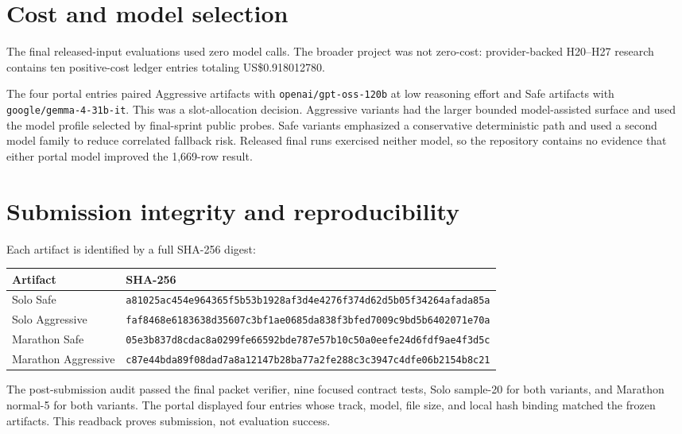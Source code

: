 \documentclass[10pt]{article}
\newcommand{\code}[1]{\texttt{#1}}
\begin{document}
\section{Cost and model selection}

The final released-input evaluations used zero model calls. The broader project was not zero-cost: provider-backed H20--H27 research contains ten positive-cost ledger entries totaling US\$0.918012780.

The four portal entries paired Aggressive artifacts with \code{openai/gpt-oss-120b} at low reasoning effort and Safe artifacts with \code{google/gemma-4-31b-it}. This was a slot-allocation decision. Aggressive variants had the larger bounded model-assisted surface and used the model profile selected by final-sprint public probes. Safe variants emphasized a conservative deterministic path and used a second model family to reduce correlated fallback risk. Released final runs exercised neither model, so the repository contains no evidence that either portal model improved the 1,669-row result.

\section{Submission integrity and reproducibility}

Each artifact is identified by a full SHA-256 digest:

\begin{longtable}{p{}p{}}
\toprule
Artifact & SHA-256 \\
\midrule
Solo Safe & \code{a81025ac454e964365f5b53b1928af3d4e4276f374d62d5b05f34264afada85a} \\
Solo Aggressive & \code{faf8468e6183638d35607c3bf1ae0685da838f3bfed7009c9bd5b6402071e70a} \\
Marathon Safe & \code{05e3b837d8cdac8a0299fe66592bde787e57b10c50a0eefe24d6fdf9ae4f3d5c} \\
Marathon Aggressive & \code{c87e44bda89f08dad7a8a12147b28ba77a2fe288c3c3947c4dfe06b2154b8c21} \\
\bottomrule
\end{longtable}

The post-submission audit passed the final packet verifier, nine focused contract tests, Solo sample-20 for both variants, and Marathon normal-5 for both variants. The portal displayed four entries whose track, model, file size, and local hash binding matched the frozen artifacts. This readback proves submission, not evaluation success.
\end{document}
